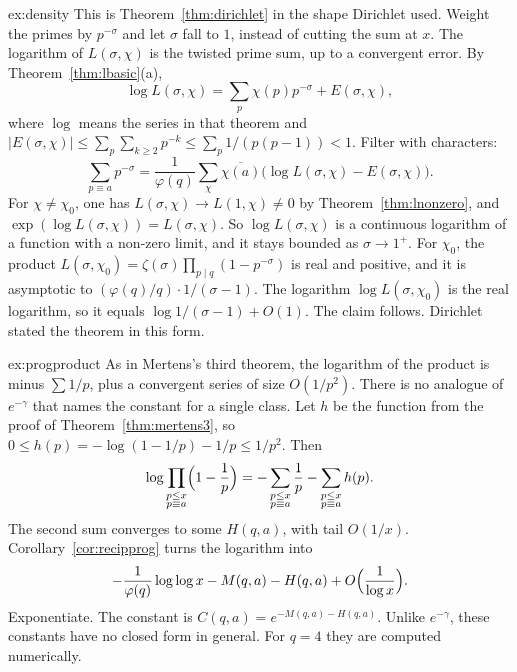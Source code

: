 \begin{solution}{ex:density}
\idea This is Theorem~\ref{thm:dirichlet} in the shape Dirichlet used. Weight the primes by $p^{-\sigma}$ and let $\sigma$ fall to $1$, instead of cutting the sum at $x$. The logarithm of $L(\sigma,\chi)$ is the twisted prime sum, up to a convergent error.
\writeup By Theorem~\ref{thm:lbasic}(a),
\[
\log L(\sigma,\chi)=\sum_p\chi(p)p^{-\sigma}+E(\sigma,\chi),
\]
where $\log$ means the series in that theorem and $|E(\sigma,\chi)|\le\sum_p\sum_{k\ge2}p^{-k}\le\sum_p 1/(p(p-1))<1$. Filter with characters:
\[
\sum_{p\equiv a}p^{-\sigma}=\frac1{\varphi(q)}\sum_\chi\overline{\chi(a)}\bigl(\log L(\sigma,\chi)-E(\sigma,\chi)\bigr).
\]
For $\chi\ne\chi_0$, one has $L(\sigma,\chi)\to L(1,\chi)\ne0$ by Theorem~\ref{thm:lnonzero}, and $\exp(\log L(\sigma,\chi))=L(\sigma,\chi)$. So $\log L(\sigma,\chi)$ is a continuous logarithm of a function with a non-zero limit, and it stays bounded as $\sigma\to1^+$. For $\chi_0$, the product $L(\sigma,\chi_0)=\zeta(\sigma)\prod_{p\mid q}(1-p^{-\sigma})$ is real and positive, and it is asymptotic to $(\varphi(q)/q)\cdot 1/(\sigma-1)$. The logarithm $\log L(\sigma,\chi_0)$ is the real logarithm, so it equals $\log 1/(\sigma-1)+O(1)$. The claim follows. Dirichlet stated the theorem in this form.
\end{solution}

\begin{solution}{ex:progproduct}
\idea As in Mertens's third theorem, the logarithm of the product is minus $\sum 1/p$, plus a convergent series of size $O(1/p^2)$. There is no analogue of $e^{-\gamma}$ that names the constant for a single class.
\writeup Let $h$ be the function from the proof of Theorem~\ref{thm:mertens3}, so $0\le h(p)=-\log(1-1/p)-1/p\le 1/p^2$. Then
\[
\log\prod_{\substack{p\le x\\p\equiv a}}\Bigl(1-\frac1p\Bigr)=-\sum_{\substack{p\le x\\p\equiv a}}\frac1p-\sum_{\substack{p\le x\\p\equiv a}}h(p).
\]
The second sum converges to some $H(q,a)$, with tail $O(1/x)$. Corollary~\ref{cor:recipprog} turns the logarithm into
\[
-\frac1{\varphi(q)}\log\log x-M(q,a)-H(q,a)+O\Bigl(\frac1{\log x}\Bigr).
\]
Exponentiate. The constant is $C(q,a)=e^{-M(q,a)-H(q,a)}$. Unlike $e^{-\gamma}$, these constants have no closed form in general. For $q=4$ they are computed numerically.
\end{solution}

